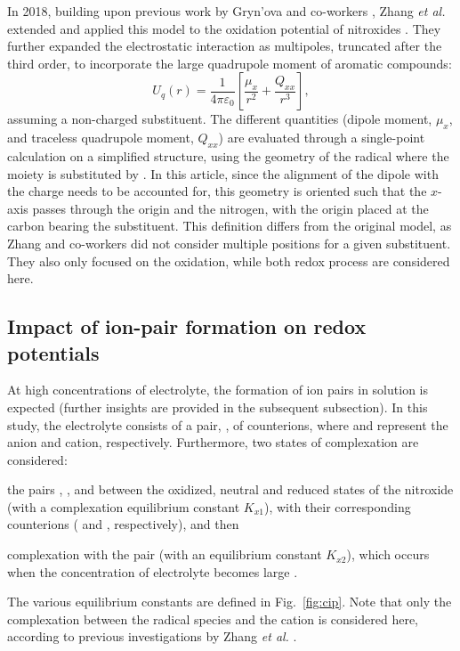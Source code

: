 \documentclass[review,preprint]{elsarticle}
\begin{document}
In 2018, building upon previous work by Gryn'ova and co-workers \cite{grynovaOriginScopeLongRange2013,grynovaSwitchingRadicalStability2013}, Zhang \textit{et al.} extended and applied this model to the oxidation potential of nitroxides \cite{zhangEffectHeteroatomFunctionality2018}. They further expanded the electrostatic interaction as multipoles, truncated after the third order, to incorporate the large quadrupole moment of aromatic compounds:
\begin{equation}
	U_q(r) =\frac{1}{4\pi\varepsilon_0} \left[\frac{\mu_x}{r^2} + \frac{Q_{xx}}{r^3}\right], \label{eq:Er}
\end{equation}
assuming a non-charged substituent. The different quantities (dipole moment, $\mu_x$, and traceless quadrupole moment, $Q_{xx}$) are evaluated through a single-point calculation on a simplified structure, using the geometry of the radical where the  moiety is substituted by . In this article, since the alignment of the dipole with the charge needs to be accounted for, this geometry is oriented such that the $x$-axis passes through the origin and the nitrogen, with the origin placed at the carbon bearing the substituent. This definition differs from the original model, as Zhang and co-workers did not consider multiple positions for a given substituent. They also only focused on the oxidation, while both redox process are considered here.


\subsection{Impact of ion-pair formation on redox potentials}

At high concentrations of electrolyte, the formation of ion pairs in solution is expected (further insights are provided in the subsequent subsection). In this study, the electrolyte consists of a pair, , of counterions, where  and  represent the anion and cation, respectively. Furthermore, two states of complexation are considered: \begin{inparaenum}[(i)]
	\item the pairs , , and  between the oxidized, neutral and reduced states of the nitroxide  (with a complexation equilibrium constant $K_{x1}$), with their corresponding counterions ( and , respectively), and then
	\item complexation with the  pair (with an equilibrium constant $K_{x2}$), which occurs when the concentration of electrolyte becomes large \cite{wylieImprovedPerformanceAllOrganic2019a}.
\end{inparaenum}
The various equilibrium constants are defined in Fig.~\ref{fig:cip}. Note that only the complexation between the radical species and the cation is considered here, according to previous investigations by Zhang \textit{et al.} \cite{zhangInteractionsImidazoliumBasedIonic2016,zhangEffectHeteroatomFunctionality2018}.
\end{document}
